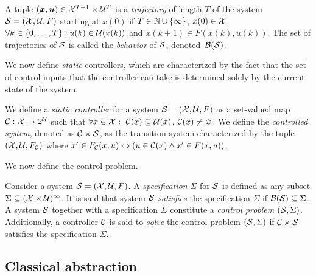 \documentclass{juliacon}
\begin{document}
\vskip 6pt
A tuple $(\boldsymbol{x}, \boldsymbol{u})\in \mathcal{X}^{T+1}\times \mathcal{U}^{T}$ is a \emph{trajectory} of length $T$ of the system $\mathcal{S}=(\mathcal{X},\mathcal{U}, F)$ starting at $x(0)$ if $T\in\mathbb{N}\cup \{\infty\}$, $x(0)\in\mathcal{X}$, $\forall k\in \{0,\ldots,T\}: u(k)\in \mathcal{U}(x(k))$ and $x(k+1) \in F(x(k), u(k))$.
The set of trajectories of $\mathcal{S}$ is called the \emph{behavior} of $\mathcal{S}$, denoted~$\mathcal{B}(\mathcal{S})$.

\vskip 6pt 

We now define \emph{static} controllers, which are characterized by the fact that the set of control inputs that the controller can take is determined solely by the current state of the system.

\begin{defi}\label{def:controller}
 We define a \emph{static controller} for a system $\mathcal{S} = (\mathcal{X},\mathcal{U}, F)$ as a set-valued map $\mathcal{C} :\mathcal{X}\rightarrow 2^{\mathcal{U}}$ such that $\forall x\in\mathcal{X}: \ \mathcal{C}(x) \subseteq \mathcal{U}(x)$, $\mathcal{C}(x) \ne \varnothing$. We define the \emph{controlled system}, denoted as $\mathcal{C}\times \mathcal{S}$, as the transition system characterized by the tuple $(\mathcal{X},\mathcal{U}, F_{\mathcal{C}})$ where
 $x'\in F_{\mathcal{C}}(x, u) \Leftrightarrow (u\in \mathcal{C}(x)\land x'\in F(x,u))$.
\end{defi}

%
We now define the control problem.
\begin{defi}\label{def:specification}
Consider a system $\mathcal{S} = (\mathcal{X},\mathcal{U}, F)$. A \emph{specification} $\Sigma$ for $\mathcal{S}$ is defined as any subset $\Sigma \subseteq (\mathcal{X}\times \mathcal{U})^{\infty}$. It is said that system $\mathcal{S}$ \emph{satisfies} the specification $\Sigma$ if $\mathcal{B}(\mathcal{S})\subseteq \Sigma$. 
A system $\mathcal{S}$ together with a specification $\Sigma$ constitute a \emph{control problem} $(\mathcal{S},\Sigma)$.
Additionally, a controller $\mathcal{C}$ is said to \emph{solve} the control problem $(\mathcal{S},\Sigma)$ if $\mathcal{C}\times \mathcal{S}$ satisfies the specification $\Sigma$.
\end{defi}




\subsection{Classical abstraction}
\end{document}
